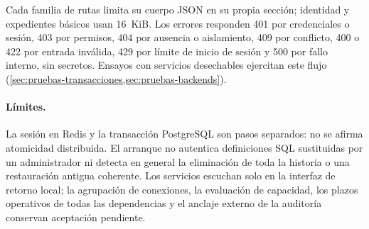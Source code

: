 Cada familia de rutas limita su cuerpo JSON en su propia sección; identidad y expedientes básicos usan 16~KiB. Los errores responden 401 por credenciales o sesión, 403 por permisos, 404 por ausencia o aislamiento, 409 por conflicto, 400 o 422 por entrada inválida, 429 por límite de inicio de sesión y 500 por fallo interno, sin secretos. Ensayos con servicios desechables ejercitan este flujo (\cref{sec:pruebas-transacciones,sec:pruebas-backends}).

\paragraph{Límites.} La sesión en Redis y la transacción PostgreSQL son pasos separados: no se afirma atomicidad distribuida. El arranque no autentica definiciones SQL sustituidas por un administrador ni detecta en general la eliminación de toda la historia o una restauración antigua coherente. Los servicios escuchan solo en la interfaz de retorno local; la agrupación de conexiones, la evaluación de capacidad, los plazos operativos de todas las dependencias y el anclaje externo de la auditoría conservan aceptación pendiente.

